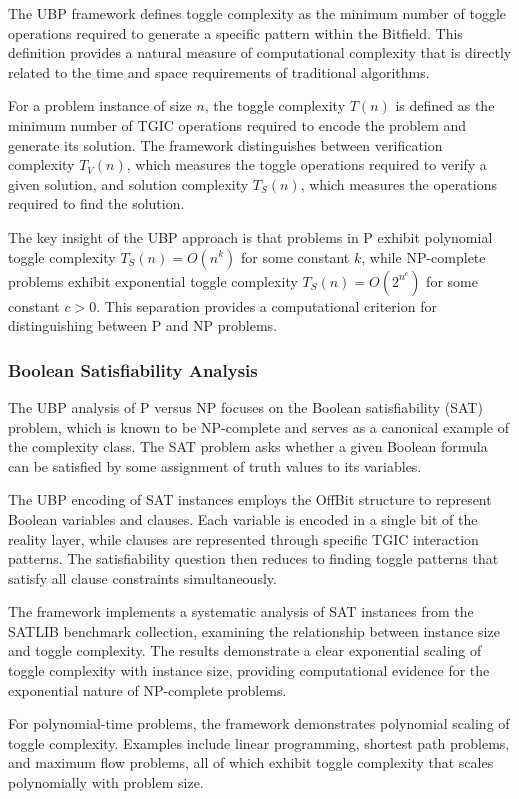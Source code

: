 \documentclass[11pt]{amsart}
\begin{document}
The UBP framework defines toggle complexity as the minimum number of toggle operations required to generate a specific pattern within the Bitfield. This definition provides a natural measure of computational complexity that is directly related to the time and space requirements of traditional algorithms.

For a problem instance of size $n$, the toggle complexity $T(n)$ is defined as the minimum number of TGIC operations required to encode the problem and generate its solution. The framework distinguishes between verification complexity $T_V(n)$, which measures the toggle operations required to verify a given solution, and solution complexity $T_S(n)$, which measures the operations required to find the solution.

The key insight of the UBP approach is that problems in P exhibit polynomial toggle complexity $T_S(n) = O(n^k)$ for some constant $k$, while NP-complete problems exhibit exponential toggle complexity $T_S(n) = O(2^{n^c})$ for some constant $c > 0$. This separation provides a computational criterion for distinguishing between P and NP problems.

\subsubsection{Boolean Satisfiability Analysis}

The UBP analysis of P versus NP focuses on the Boolean satisfiability (SAT) problem, which is known to be NP-complete and serves as a canonical example of the complexity class. The SAT problem asks whether a given Boolean formula can be satisfied by some assignment of truth values to its variables.

The UBP encoding of SAT instances employs the OffBit structure to represent Boolean variables and clauses. Each variable is encoded in a single bit of the reality layer, while clauses are represented through specific TGIC interaction patterns. The satisfiability question then reduces to finding toggle patterns that satisfy all clause constraints simultaneously.

The framework implements a systematic analysis of SAT instances from the SATLIB benchmark collection, examining the relationship between instance size and toggle complexity. The results demonstrate a clear exponential scaling of toggle complexity with instance size, providing computational evidence for the exponential nature of NP-complete problems.

For polynomial-time problems, the framework demonstrates polynomial scaling of toggle complexity. Examples include linear programming, shortest path problems, and maximum flow problems, all of which exhibit toggle complexity that scales polynomially with problem size.
\end{document}
